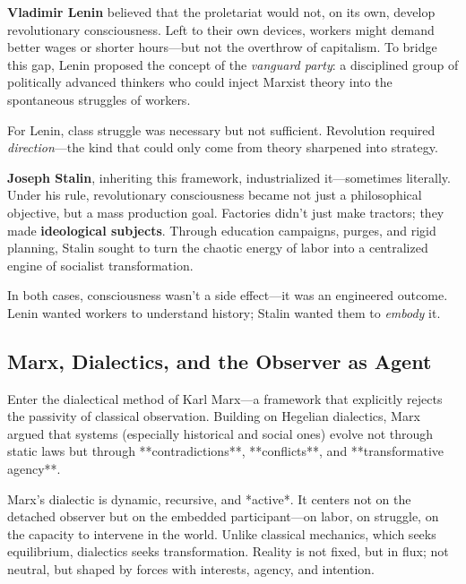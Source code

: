 \begin{tcolorbox}[colback=gray!5!white, colframe=black!80!white, title={Historical Sidenote: Lenin, Stalin, and the Machinery of Revolutionary Consciousness}]
  \textbf{Vladimir Lenin} believed that the proletariat would not, on its own, develop revolutionary consciousness. Left to their own devices, workers might demand better wages or shorter hours—but not the overthrow of capitalism. To bridge this gap, Lenin proposed the concept of the \emph{vanguard party}: a disciplined group of politically advanced thinkers who could inject Marxist theory into the spontaneous struggles of workers.  
  
  For Lenin, class struggle was necessary but not sufficient. Revolution required \emph{direction}—the kind that could only come from theory sharpened into strategy.  
  
  \medskip
  
  \textbf{Joseph Stalin}, inheriting this framework, industrialized it—sometimes literally. Under his rule, revolutionary consciousness became not just a philosophical objective, but a mass production goal. Factories didn’t just make tractors; they made \textbf{ideological subjects}. Through education campaigns, purges, and rigid planning, Stalin sought to turn the chaotic energy of labor into a centralized engine of socialist transformation.  
  
  \medskip
  
  In both cases, consciousness wasn’t a side effect—it was an engineered outcome. Lenin wanted workers to understand history; Stalin wanted them to \emph{embody} it.
\end{tcolorbox}



\subsection{Marx, Dialectics, and the Observer as Agent}

Enter the dialectical method of Karl Marx—a framework that explicitly rejects the passivity of classical observation. Building on Hegelian dialectics, Marx argued that systems (especially historical and social ones) evolve not through static laws but through **contradictions**, **conflicts**, and **transformative agency**.

Marx's dialectic is dynamic, recursive, and *active*. It centers not on the detached observer but on the embedded participant—on labor, on struggle, on the capacity to intervene in the world. Unlike classical mechanics, which seeks equilibrium, dialectics seeks transformation. Reality is not fixed, but in flux; not neutral, but shaped by forces with interests, agency, and intention.

